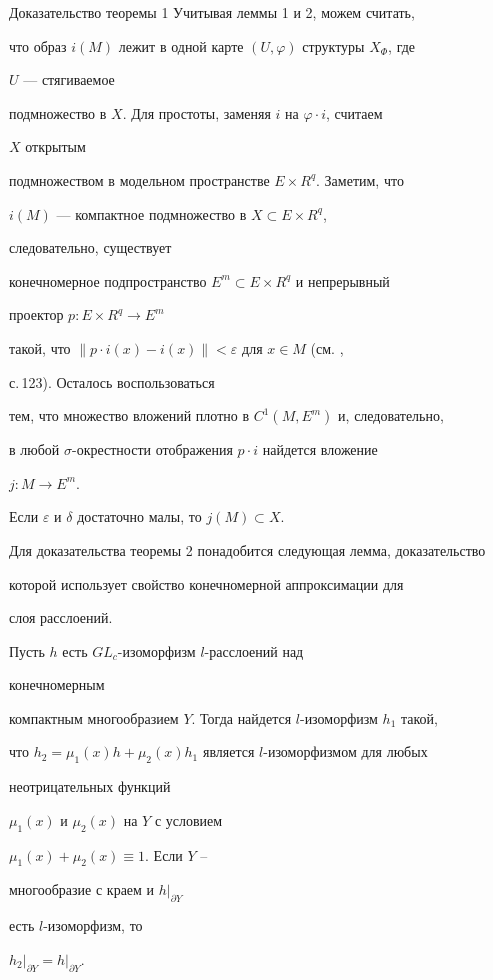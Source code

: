 \begin{pf*}{Доказательство теоремы 1} Учитывая леммы 1 и 2, можем считать, 


что образ $i(M)$ лежит в одной карте $(U,\varphi)$ структуры $X_\Phi$, где 


$U$ --- стягиваемое 


подмножество в $X$. Для простоты, заменяя $i$ на $\varphi\cdot i$, считаем 


$X$ открытым 


подмножеством в модельном пространстве $E\times R^q$. Заметим, что 


$i(M)$ --- компактное подмножество в $X\subset E\times R^q$, 


следовательно, существует 


конечномерное подпространство $E^m\subset E\times R^q$ и непрерывный 


проектор $p:E\times R^q\to E^m$ 


такой, что $\|p\cdot i(x)-i(x)\|<\varepsilon$ для $x\in M$ (см. \cite{Kra}, 


с.\,123). Осталось воспользоваться 


тем, что множество вложений плотно в $C^1(M,E^m)$ и, следовательно, 


в любой $\sigma$-окрестности отображения $p\cdot i$ найдется вложение 


$j:M\to E^m$. 


Если $\varepsilon$ и $\delta$ достаточно малы, то $j(M)\subset X$. 


\end{pf*} 


 


Для доказательства теоремы 2 понадобится следующая лемма, доказательство 


которой использует свойство конечномерной аппроксимации для 


слоя расслоений. 


 


\begin{lem} Пусть $h$ есть $GL_c$-изоморфизм $l$-расслоений над 


конечномерным 


компактным многообразием $Y$. Тогда найдется $l$-изоморфизм $h_1$ такой, 


что $h_2=\mu_1(x)h+\mu_2(x)h_1$ является $l$-изоморфизмом для любых 


неотрицательных функций 


$\mu_1(x)$ и $\mu_2(x)$ на $Y$ с условием


$\mu_1(x)+\mu_2(x)\equiv 1$. Если $Y$ -- 


многообразие с краем и $\left. h\right|_{\partial Y}$ 


есть $l$-изоморфизм, то 


$\left. h_2\right|_{\partial Y}=\left. h\right|_{\partial Y}$. 


\end{lem} 


